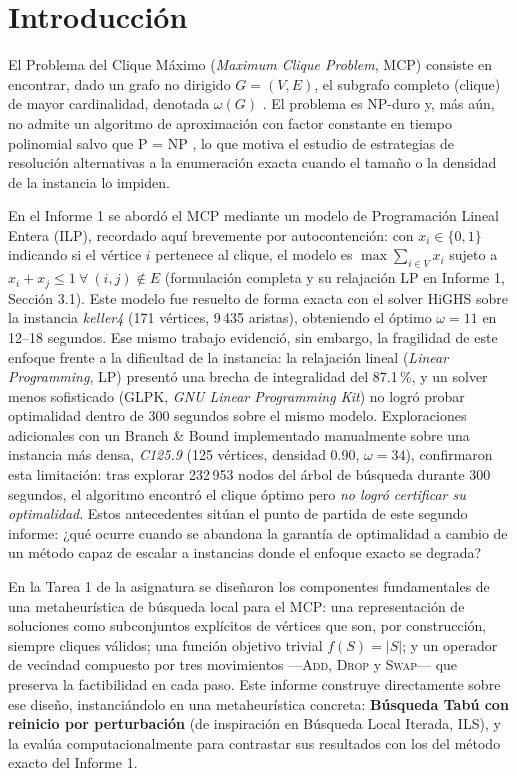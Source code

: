 \section{Introducción}

El Problema del Clique Máximo (\textit{Maximum Clique Problem}, MCP) consiste en encontrar, dado un grafo no dirigido $G=(V,E)$, el subgrafo completo (clique) de mayor cardinalidad, denotada $\omega(G)$ \parencite{pardalos1994maximum}. El problema es NP-duro y, más aún, no admite un algoritmo de aproximación con factor constante en tiempo polinomial salvo que P = NP \parencite{pardalos1994maximum, bomze1999}, lo que motiva el estudio de estrategias de resolución alternativas a la enumeración exacta cuando el tamaño o la densidad de la instancia lo impiden.

En el Informe 1 se abordó el MCP mediante un modelo de Programación Lineal Entera (ILP), recordado aquí brevemente por autocontención: con $x_i\in\{0,1\}$ indicando si el vértice $i$ pertenece al clique, el modelo es $\max \sum_{i \in V} x_i$ sujeto a $x_i + x_j \leq 1\ \forall\ (i,j) \notin E$ (formulación completa y su relajación LP en Informe 1, Sección 3.1). Este modelo fue resuelto de forma exacta con el solver HiGHS \parencite{highs2024} sobre la instancia \textit{keller4} (171 vértices, 9\,435 aristas), obteniendo el óptimo $\omega=11$ en 12--18 segundos. Ese mismo trabajo evidenció, sin embargo, la fragilidad de este enfoque frente a la dificultad de la instancia: la relajación lineal (\textit{Linear Programming}, LP) presentó una brecha de integralidad del 87.1\,\%, y un solver menos sofisticado (GLPK, \textit{GNU Linear Programming Kit}) no logró probar optimalidad dentro de 300 segundos sobre el mismo modelo. Exploraciones adicionales con un Branch \& Bound implementado manualmente sobre una instancia más densa, \textit{C125.9} (125 vértices, densidad 0.90, $\omega=34$), confirmaron esta limitación: tras explorar 232\,953 nodos del árbol de búsqueda durante 300 segundos, el algoritmo encontró el clique óptimo pero \emph{no logró certificar su optimalidad}. Estos antecedentes sitúan el punto de partida de este segundo informe: ¿qué ocurre cuando se abandona la garantía de optimalidad a cambio de un método capaz de escalar a instancias donde el enfoque exacto se degrada?

En la Tarea 1 de la asignatura se diseñaron los componentes fundamentales de una metaheurística de búsqueda local para el MCP: una representación de soluciones como subconjuntos explícitos de vértices que son, por construcción, siempre cliques válidos; una función objetivo trivial $f(S)=|S|$; y un operador de vecindad compuesto por tres movimientos —\textsc{Add}, \textsc{Drop} y \textsc{Swap}— que preserva la factibilidad en cada paso. Este informe construye directamente sobre ese diseño, instanciándolo en una metaheurística concreta: \textbf{Búsqueda Tabú con reinicio por perturbación} (de inspiración en Búsqueda Local Iterada, ILS), y la evalúa computacionalmente para contrastar sus resultados con los del método exacto del Informe 1.

